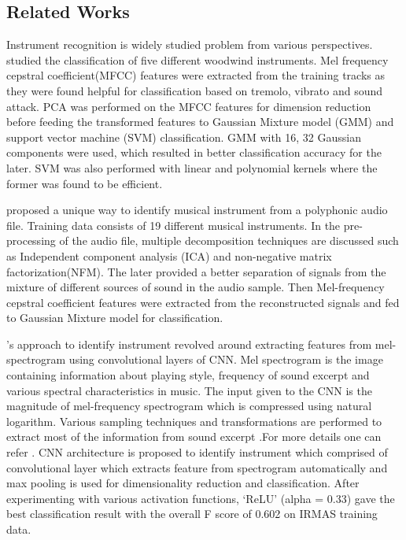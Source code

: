 \documentclass[conference]{IEEEtran}
\begin{document}
\subsection{Related Works} Instrument recognition is widely studied problem from various perspectives. \citet{essid2004} studied the classification of five different woodwind instruments. Mel frequency cepstral coefficient(MFCC) features were extracted from the training tracks as they were found helpful for classification based on tremolo, vibrato and sound attack. PCA was performed on the MFCC features for dimension reduction before feeding the transformed features to Gaussian Mixture model (GMM) and support vector machine (SVM) classification. GMM with 16, 32 Gaussian components were used, which resulted in better classification accuracy for the later. SVM was also performed with linear and polynomial kernels where the former was found to be efficient.

\citet{heittola2009musical} proposed a unique way to identify musical instrument from a polyphonic audio file. Training data consists of 19 different musical instruments. In the pre-processing of the audio file, multiple decomposition techniques are discussed such as Independent component analysis (ICA) and non-negative matrix factorization(NFM). The later provided a better separation of signals from the mixture of different sources of sound in the audio sample. Then Mel-frequency cepstral coefficient features were extracted from the reconstructed signals and fed to Gaussian Mixture model for classification.

\citet{han2017deep}'s approach to identify instrument revolved around extracting features from mel-spectrogram using convolutional layers of CNN. Mel spectrogram is the image containing information about playing style, frequency of sound excerpt and various spectral characteristics in music. The input given to the CNN is the magnitude of mel-frequency spectrogram which is compressed using natural logarithm. Various sampling techniques and transformations are performed to extract most of the information from sound excerpt .For more details one can refer \cite{han2017deep}. CNN architecture is proposed to identify instrument which comprised of convolutional layer which extracts feature from spectrogram automatically and max pooling is used for dimensionality reduction and classification. After experimenting with various activation functions, `ReLU' (alpha = 0.33) gave the best classification result with the overall F score of 0.602 on IRMAS training data.
\end{document}
